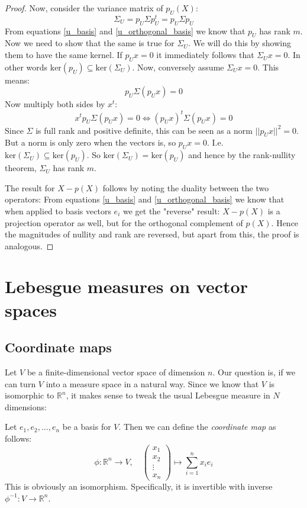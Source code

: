 \documentclass[12pt, a4paper]{article}
\numberwithin{equation}{section}
\begin{document}
\begin{proof}
Now, consider the variance matrix of $p_U(X)$:
\begin{equation}
\Sigma_U=p_U\Sigma p_U^t=p_U\Sigma p_U
\end{equation}
From equations \ref{u_basis} and \ref{u_orthogonal_basis} we know that $p_U$ has rank $m$. Now we need to show that the same is true for $\Sigma_U$. We will do this by showing them to have the same kernel. If $p_U x=0$ it immediately follows that $\Sigma_U x=0$. In other words $\textrm{ker}(p_U)\subseteq\textrm{ker}(\Sigma_U)$. Now, conversely assume $\Sigma_U x=0$. This means:
\begin{equation}
p_U\Sigma(p_U x)=0
\end{equation}
Now multiply both sides by $x^t$:
\begin{equation}
x^t p_U\Sigma(p_U x)=0\Leftrightarrow (p_U x)^t\Sigma(p_U x)=0
\end{equation}
Since $\Sigma$ is full rank and positive definite, this can be seen as a norm $||p_U x||^2=0$. But a norm is only zero when the vectors is, so $p_U x=0$. I.e. $\textrm{ker}(\Sigma_U)\subseteq\textrm{ker}(p_U)$. So $\textrm{ker}(\Sigma_U)=\textrm{ker}(p_U)$ and hence by the rank-nullity theorem, $\Sigma_U$ has rank $m$.

The result for $X-p(X)$ follows by noting the duality between the two operators: From equations \ref{u_basis} and \ref{u_orthogonal_basis} we know that when applied to basis vectors $e_i$ we get the "reverse" result: $X-p(X)$ is a projection operator as well, but for the orthogonal complement of $p(X)$. Hence the magnitudes of nullity and rank are reversed, but apart from this, the proof is analogous.
\end{proof}

\section{Lebesgue measures on vector spaces}

\subsection{Coordinate maps}
Let $V$ be a finite-dimensional vector space of dimension $n$. Our question is, if we can turn $V$ into a measure space in a natural way. Since we know that $V$ is isomorphic to $\mathbb{R}^n$, it makes sense to tweak the usual Lebesgue measure in $N$ dimensions:

Let $e_1,e_2,\ldots,e_n$ be a basis for $V$. Then we can define the \textit{coordinate map} as follows:
\begin{equation}
\phi:\mathbb{R}^n\rightarrow V,\quad
\begin{pmatrix}
x_1	\\	x_2	\\ \vdots	\\ x_n
\end{pmatrix}
\mapsto\sum_{i=1}^n x_i e_i
\end{equation}
This is obviously an isomorphism. Specifically, it is invertible with inverse $\phi^{-1}: V\rightarrow\mathbb{R}^n$.
\end{document}
